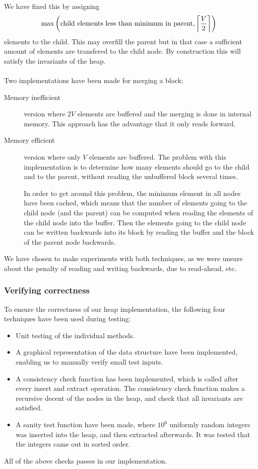 We have fixed this by assigning
\[
  \max \left( \text{child elements less than minimum in parent}, \ceil*{\frac{V}{2}} \right)
\]
elements to the child. This may overfill the parent but in that case a sufficient amount of elements
are transfered to the child node. By construction
this will satisfy the invariants of the heap.
\\
\\
Two implementations have been made for merging a block:
\begin{description}
\item[Memory inefficient] version where $2V$ elements are buffered
  and the merging is done in internal memory. This approach has the
  advantage that it only reads forward.
\item[Memory efficient] version where only $V$ elements are
  buffered. The problem with this implementation is to determine how
  many elements should go to the child and to the parent, without
  reading the unbuffered block several times.

  In order to get around this problem, the minimum element in all
  nodes have been cached, which means that the number of elements
  going to the child node (and the parent) can be computed when
  reading the elements of the child node into the buffer. Then the
  elements going to the child node can be written backwards into its
  block by reading the buffer and the block of the parent node
  backwards.
\end{description}

We have chosen to make experiments with both techniques, as we were unsure about
the penalty of reading and writing backwards, due to read-ahead,
etc.

\subsubsection{Verifying correctness}
To ensure the correctness of our heap implementation, the following
four techniques have been used during testing:
\begin{itemize}
\item Unit testing of the individual methods.
\item A graphical representation of the data structure have been
  implemented, enabling us to manually verify small test inputs.
\item A consistency check function has been implemented, which is
  called after every insert and extract operation. The consistency
  check function makes a recursive decent of the nodes in the heap,
  and check that all invariants are satisfied.
\item A sanity test function have been made, where $10^6$
  uniformly random integers was inserted into the heap, and then
  extracted afterwards. It was tested that the integers came out in
  sorted order.
\end{itemize}
All of the above checks passes in our implementation.

